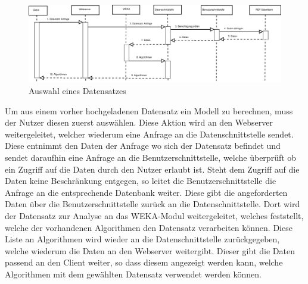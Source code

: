 \begin{figure}[h]
	\hspace{-0.25\linewidth}\includegraphics[width=1.5\linewidth]{Grafik/Diagramm/Szenarios/Berechnung}
	\caption[]{Auswahl eines Datensatzes}
\end{figure}
\noindent Um aus einem vorher hochgeladenen Datensatz ein Modell zu berechnen, muss der Nutzer diesen zuerst auswählen. Diese Aktion wird an den Webserver weitergeleitet, welcher wiederum eine Anfrage an die Datenschnittstelle sendet. Diese entnimmt den Daten der Anfrage wo sich der Datensatz befindet und sendet daraufhin eine Anfrage an die Benutzerschnittstelle, welche überprüft ob ein Zugriff auf die Daten durch den Nutzer erlaubt ist. Steht dem Zugriff auf die Daten keine Beschränkung entgegen, so leitet die Benutzerschnittstelle die Anfrage an die entsprechende Datenbank weiter. Diese gibt die angeforderten Daten über die Benutzerschnittstelle zurück an die Datenschnittstelle. Dort wird der Datensatz zur Analyse an das WEKA-Modul weitergeleitet, welches feststellt, welche der vorhandenen Algorithmen den Datensatz verarbeiten können. Diese Liste an Algorithmen wird wieder an die Datenschnittstelle zurückgegeben, welche wiederum die Daten an den Webserver weitergibt. Dieser gibt die Daten passend an den Client weiter, so dass diesem angezeigt werden kann, welche Algorithmen mit dem gewählten Datensatz verwendet werden können.\\

